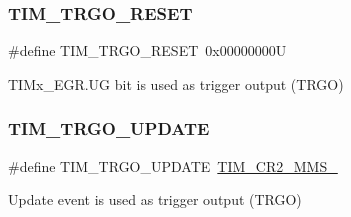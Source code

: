 \subsubsection{\texorpdfstring{TIM\_TRGO\_RESET}{TIM\_TRGO\_RESET}}
{\footnotesize\ttfamily \#define T\+I\+M\+\_\+\+T\+R\+G\+O\+\_\+\+R\+E\+S\+ET~0x00000000U}

T\+I\+Mx\+\_\+\+E\+G\+R.\+UG bit is used as trigger output (T\+R\+GO) \mbox{\label{group___t_i_m___master___mode___selection_ga27521aebd507e562fe7fba6dfc639a67}} 
\subsubsection{\texorpdfstring{TIM\_TRGO\_UPDATE}{TIM\_TRGO\_UPDATE}}
{\footnotesize\ttfamily \#define T\+I\+M\+\_\+\+T\+R\+G\+O\+\_\+\+U\+P\+D\+A\+TE~\mbox{\hyperlink{group___peripheral___registers___bits___definition_ga4b1036929b0a4ba5bd5cced9b8e0f4c3}{T\+I\+M\+\_\+\+C\+R2\+\_\+\+M\+M\+S\+\_}}}

Update event is used as trigger output (T\+R\+GO) 